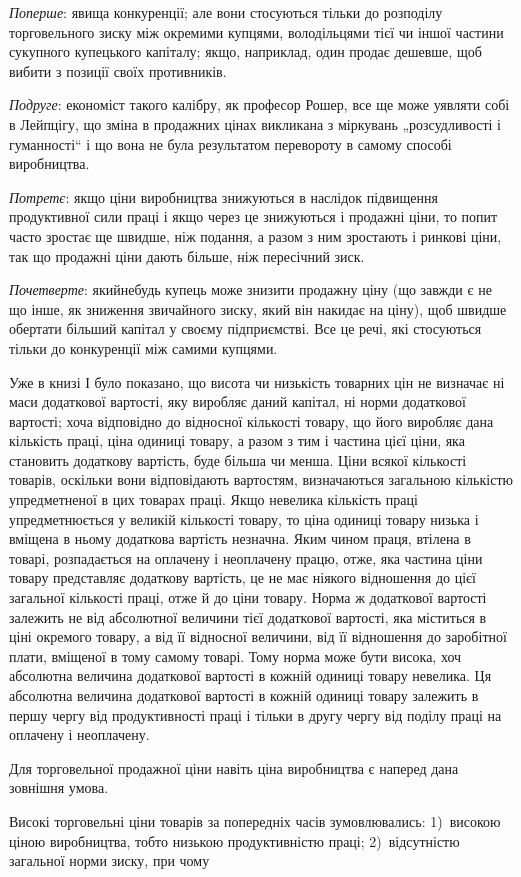 
\emph{Поперше}: явища конкуренції; але вони стосуються тільки до
розподілу торговельного зиску між окремими купцями, володільцями
тієї чи іншої частини сукупного купецького капіталу; якщо,
наприклад, один продає дешевше, щоб вибити з позиції своїх
противників.

\emph{Подруге}: економіст такого калібру, як професор Рошер, все
ще може уявляти собі в Лейпцігу, що зміна в продажних цінах
викликана з міркувань „розсудливості і гуманності“ і що вона
не була результатом перевороту в самому способі виробництва.

\emph{Потретє}: якщо ціни виробництва знижуються в наслідок
підвищення продуктивної сили праці і якщо через це знижуються
і продажні ціни, то попит часто зростає ще швидше, ніж
подання, а разом з ним зростають і ринкові ціни, так що продажні
ціни дають більше, ніж пересічний зиск.

\emph{Почетверте}: якийнебудь купець може знизити продажну
ціну (що завжди є не що інше, як зниження звичайного зиску,
який він накидає на ціну), щоб швидше обертати більший
капітал у своєму підприємстві. Все це речі, які стосуються
тільки до конкуренції між самими купцями.

Уже в книзі І було показано, що висота чи низькість товарних
цін не визначає ні маси додаткової вартості, яку
виробляє даний капітал, ні норми додаткової вартості; хоча
відповідно до відносної кількості товару, що його виробляє
дана кількість праці, ціна одиниці товару, а разом з тим
і частина цієї ціни, яка становить додаткову вартість, буде більша
чи менша. Ціни всякої кількості товарів, оскільки вони відповідають
вартостям, визначаються загальною кількістю упредметненої
в цих товарах праці. Якщо невелика кількість праці
упредметнюється у великій кількості товару, то ціна одиниці
товару низька і вміщена в ньому додаткова вартість незначна.
Яким чином праця, втілена в товарі, розпадається на оплачену
і неоплачену працю, отже, яка частина ціни товару представляє
додаткову вартість, це не має ніякого відношення до цієї загальної
кількості праці, отже й до ціни товару. Норма ж додаткової
вартості залежить не від абсолютної величини тієї
додаткової вартості, яка міститься в ціні окремого товару,
а від її відносної величини, від її відношення до заробітної плати,
вміщеної в тому самому товарі. Тому норма може бути висока,
хоч абсолютна величина додаткової вартості в кожній одиниці
товару невелика. Ця абсолютна величина додаткової вартості
в кожній одиниці товару залежить в першу чергу від продуктивності
праці і тільки в другу чергу від поділу праці на оплачену
і неоплачену.

Для торговельної продажної ціни навіть ціна виробництва є
наперед дана зовнішня умова.

Високі торговельні ціни товарів за попередніх часів зумовлювались:
1)~високою ціною виробництва, тобто низькою продуктивністю
праці; 2)~відсутністю загальної норми зиску, при чому
\parbreak{}  %

